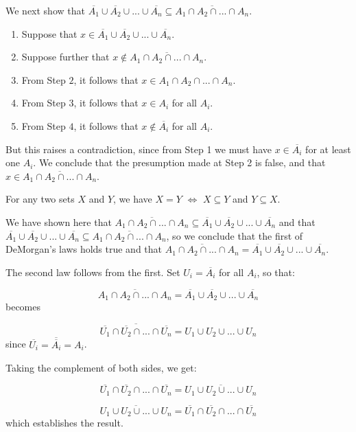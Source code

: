 \documentclass[a4paper,12pt]{article}
\begin{document}
We next show that $\overline{A_1} \cup \overline{A_2} \cup ... \cup \overline{A_n} \subseteq \overline{A_1 \cap A_2 \cap ... \cap A_n}$.

\begin{enumerate}
\item Suppose that $x \in \overline{A_1} \cup \overline{A_2} \cup ... \cup \overline{A_n}$.
\item Suppose further that $x \notin \overline{A_1 \cap A_2 \cap ... \cap A_n}$.
\item From Step $2$, it follows that $x \in A_1 \cap A_2 \cap ... \cap A_n$.
\item From Step $3$, it follows that $x \in A_i$ for all $A_i$.
\item From Step $4$, it follows that $x \notin \overline{A_i}$ for all $A_i$.
\end{enumerate}

But this raises a contradiction, since from Step 1 we must have $x \in \overline{A_i}$ for at least one $A_i$. We conclude that the presumption made at Step 2 is false, and that $x \in \overline{A_1 \cap A_2 \cap ... \cap A_n}$.

For any two sets $X$ and $Y$, we have $X=Y$ $\iff$ $X \subseteq Y$ and $Y \subseteq X$. 

We have shown here that $\overline{A_1 \cap A_2 \cap ... \cap A_n} \subseteq \overline{A_1} \cup \overline{A_2} \cup ... \cup \overline{A_n}$ and that $\overline{A_1} \cup \overline{A_2} \cup ... \cup \overline{A_n} \subseteq \overline{A_1 \cap A_2 \cap ... \cap A_n}$, so we conclude that the first of DeMorgan's laws holds true and that $\overline{A_1 \cap A_2 \cap ... \cap A_n} = \overline{A_1} \cup \overline{A_2} \cup ... \cup \overline{A_n}$.

The second law follows from the first. Set $U_i = \overline{A_i}$ for all $A_i$, so that:

\[ \overline{A_1 \cap A_2 \cap ... \cap A_n} = \overline{A_1} \cup \overline{A_2} \cup ... \cup \overline{A_n} \]
becomes

\[ \overline{ \overline{U_1} \cap \overline{U_2} \cap ... \cap \overline{U_n}} = U_1 \cup U_2 \cup ... \cup U_n \]
since $\overline{U_i} = \overline{\overline{A_i}} = A_i$.

Taking the complement of both sides, we get:

\[  \overline{U_1} \cap \overline{U_2} \cap ... \cap \overline{U_n} = \overline{U_1 \cup U_2 \cup ... \cup U_n} \]

\[   \overline{U_1 \cup U_2 \cup ... \cup U_n} = \overline{U_1} \cap \overline{U_2} \cap ... \cap \overline{U_n} \]
which establishes the result.
\end{document}

